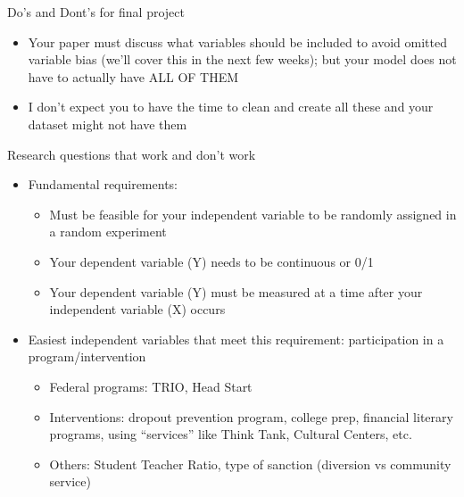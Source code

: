 \documentclass[
  8pt,
  ignorenonframetext,
  dvipsnames]{beamer}
\providecommand{\tightlist}{%
  \setlength{\itemsep}{0pt}\setlength{\parskip}{0pt}}
\let\olditem\item
\renewcommand{\item}{%
  \olditem\vspace{4pt}
}
\begin{document}
\begin{frame}{Do's and Dont's for final project}
\begin{itemize}
  \begin{itemize}
  \tightlist
  \item
    Your paper must discuss what variables should be included to avoid
    omitted variable bias (we'll cover this in the next few weeks); but
    your model does not have to actually have ALL OF THEM
  \item
    I don't expect you to have the time to clean and create all these
    and your dataset might not have them
  \end{itemize}
\end{itemize}

\end{frame}

\begin{frame}{Research questions that work and don't work}
\protect\hypertarget{research-questions-that-work-and-dont-work}{}

\begin{itemize}
\tightlist
\item
  Fundamental requirements:

  \begin{itemize}
  \tightlist
  \item
    Must be feasible for your independent variable to be randomly
    assigned in a random experiment
  \item
    Your dependent variable (Y) needs to be continuous or 0/1
  \item
    Your dependent variable (Y) must be measured at a time after your
    independent variable (X) occurs
  \end{itemize}
\end{itemize}

\medskip

\begin{itemize}
\tightlist
\item
  Easiest independent variables that meet this requirement:
  participation in a program/intervention

  \begin{itemize}
  \tightlist
  \item
    Federal programs: TRIO, Head Start
  \item
    Interventions: dropout prevention program, college prep, financial
    literary programs, using ``services'' like Think Tank, Cultural
    Centers, etc.
  \item
    Others: Student Teacher Ratio, type of sanction (diversion vs
    community service)
  \end{itemize}
\end{itemize}


\end{frame}
\end{document}
